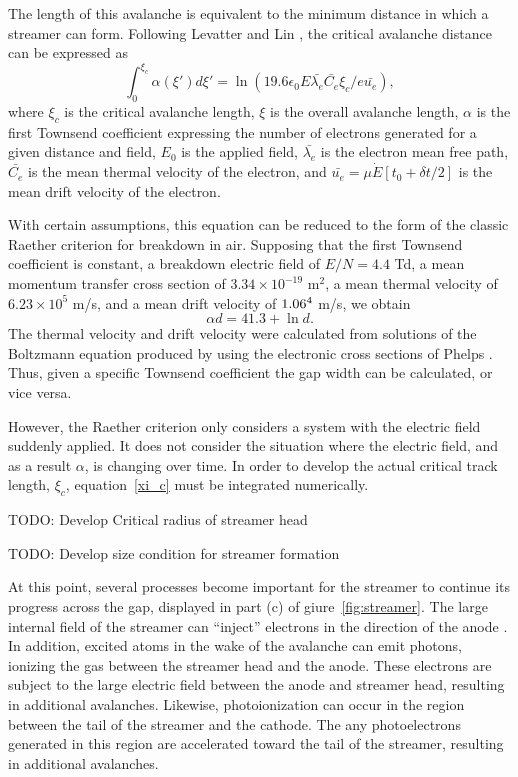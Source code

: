 The length of this avalanche is equivalent to the minimum distance in
which a streamer can form. Following Levatter and Lin
\cite{Levatter1980}, the critical avalanche distance can be expressed as
\begin{equation}
  \int_0^{\xi_c}\alpha(\xi')d\xi' = \ln\left(19.6 \epsilon_0 E \bar{\lambda_e}
                                           \bar{C_e}\xi_c/e\bar{u_e}\right),
  \label{eq:xi_c}
\end{equation}
where $\xi_c$ is the critical avalanche length, $\xi$ is the overall
avalanche length, $\alpha$ is the first Townsend coefficient expressing
the number of electrons generated for a given distance and field, $E_0$ is
the applied field, $\bar{\lambda_e}$ is the electron mean free path,
$\bar{C_e}$ is the mean thermal velocity of the electron, and $\bar{u_e}
= \mu\dot{E}[t_0+\delta t/2]$ is the mean drift velocity of the
electron.

With certain assumptions, this equation can be reduced to the form of
the classic Raether criterion for breakdown in air. Supposing that the
first Townsend coefficient is constant, a breakdown electric field of
$E/N=4.4$ Td, a mean momentum transfer cross section of
$3.34\times10^{-19}$ m$^2$, a mean thermal velocity of $6.23\times10^5$
m/s, and a mean drift velocity of $1.06\time10^4$ m/s, we obtain
\begin{equation}
  \alpha d = 41.3 + \ln{d}.
\end{equation}
The thermal velocity and drift velocity were calculated from solutions
of the Boltzmann equation produced by 
\cite{Hagelaar2005} using the electronic cross sections of Phelps
\cite{Phelps2002}. Thus, given a specific Townsend coefficient the gap
width can be calculated, or vice versa.

However, the Raether criterion only considers a system with the electric
field suddenly applied. It does not consider the situation where the
electric field, and as a result $\alpha$, is changing over time. In
order to develop the actual critical track length, $\xi_c$,
equation~\ref{xi_c} must be integrated numerically. 

TODO: Develop Critical radius of streamer head

TODO: Develop size condition for streamer formation

At this point, several processes become important for the streamer to
continue its progress across the gap, displayed in part (c) of
giure~\ref{fig:streamer}. The large internal field of the streamer can
``inject'' electrons in the direction of the anode \cite{Kunhardt1980}.
In addition, excited atoms in the wake of the avalanche can emit
photons, ionizing the gas between the streamer head and the anode. These
electrons are subject to the large electric field between the anode and
streamer head, resulting in additional avalanches. Likewise,
photoionization can occur in the region between the tail of the streamer
and the cathode. The any photoelectrons generated in this region are
accelerated toward the tail of the streamer, resulting in additional
avalanches.

